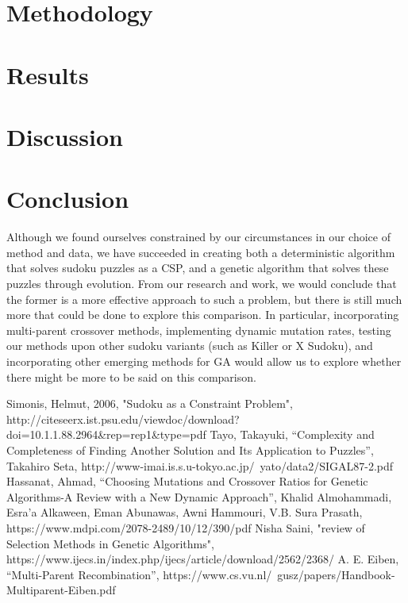 \documentclass[10pt, conference]{IEEEtran}
\begin{document}
\section{Methodology}

\section{Results}

\section{Discussion}

\section{Conclusion}

Although we found ourselves constrained by our circumstances in our choice of method and data, we have succeeded in creating both a deterministic algorithm that solves sudoku puzzles as a CSP, and a genetic algorithm that solves these puzzles through evolution. From our research and work, we would conclude that the former is a more effective approach to such a problem, but there is still much more that could be done to explore this comparison. In particular, incorporating multi-parent crossover methods, implementing dynamic mutation rates, testing our methods upon other sudoku variants (such as Killer or X Sudoku), and incorporating other emerging methods for GA would allow us to explore whether there might be more to be said on this comparison.

\begin{thebibliography}{00}

Simonis, Helmut, 2006, "Sudoku as a Constraint Problem", http://citeseerx.ist.psu.edu/viewdoc/download?doi=10.1.1.88.2964\&rep=rep1\&type=pdf
Tayo, Takayuki, “Complexity and Completeness of Finding Another Solution and Its Application to Puzzles”, Takahiro Seta, http://www-imai.is.s.u-tokyo.ac.jp/~yato/data2/SIGAL87-2.pdf
Hassanat, Ahmad, “Choosing Mutations and Crossover Ratios for Genetic Algorithms-A Review with a New Dynamic Approach”,  Khalid Almohammadi, Esra’a Alkaween, Eman Abunawas, Awni Hammouri, V.B. Sura Prasath, https://www.mdpi.com/2078-2489/10/12/390/pdf 
Nisha Saini, "review of Selection Methods in Genetic Algorithms", https://www.ijecs.in/index.php/ijecs/article/download/2562/2368/
A. E. Eiben, “Multi-Parent Recombination”, https://www.cs.vu.nl/~gusz/papers/Handbook-Multiparent-Eiben.pdf

\end{thebibliography}
\end{document}

